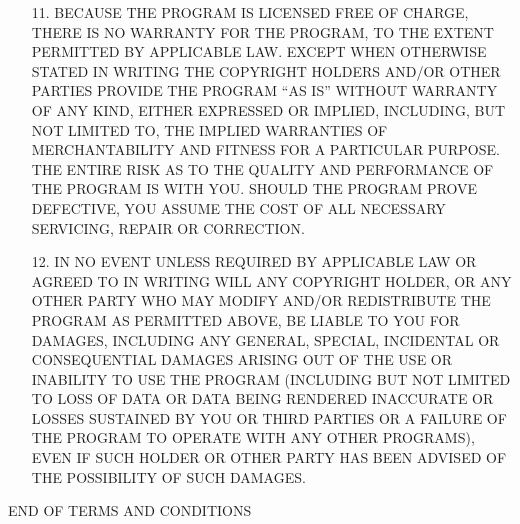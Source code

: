 \begin{enumerate}
\newpage
\begin{center}
{\bf NO WARRANTY}
\end{center}
\item[11.] BECAUSE THE PROGRAM IS LICENSED FREE OF CHARGE, THERE IS NO WARRANTY
FOR THE PROGRAM, TO THE EXTENT PERMITTED BY APPLICABLE LAW.  EXCEPT WHEN
OTHERWISE STATED IN WRITING THE COPYRIGHT HOLDERS AND/OR OTHER PARTIES
PROVIDE THE PROGRAM ``AS IS'' WITHOUT WARRANTY OF ANY KIND, EITHER EXPRESSED
OR IMPLIED, INCLUDING, BUT NOT LIMITED TO, THE IMPLIED WARRANTIES OF
MERCHANTABILITY AND FITNESS FOR A PARTICULAR PURPOSE.  THE ENTIRE RISK AS
TO THE QUALITY AND PERFORMANCE OF THE PROGRAM IS WITH YOU.  SHOULD THE
PROGRAM PROVE DEFECTIVE, YOU ASSUME THE COST OF ALL NECESSARY SERVICING,
REPAIR OR CORRECTION.
\item[12.] IN NO EVENT UNLESS REQUIRED BY APPLICABLE LAW OR AGREED TO IN WRITING
WILL ANY COPYRIGHT HOLDER, OR ANY OTHER PARTY WHO MAY MODIFY AND/OR
REDISTRIBUTE THE PROGRAM AS PERMITTED ABOVE, BE LIABLE TO YOU FOR DAMAGES,
INCLUDING ANY GENERAL, SPECIAL, INCIDENTAL OR CONSEQUENTIAL DAMAGES ARISING
OUT OF THE USE OR INABILITY TO USE THE PROGRAM (INCLUDING BUT NOT LIMITED
TO LOSS OF DATA OR DATA BEING RENDERED INACCURATE OR LOSSES SUSTAINED BY
YOU OR THIRD PARTIES OR A FAILURE OF THE PROGRAM TO OPERATE WITH ANY OTHER
PROGRAMS), EVEN IF SUCH HOLDER OR OTHER PARTY HAS BEEN ADVISED OF THE
POSSIBILITY OF SUCH DAMAGES.
\end{enumerate}

\begin{center}
END OF TERMS AND CONDITIONS
\end{center}
